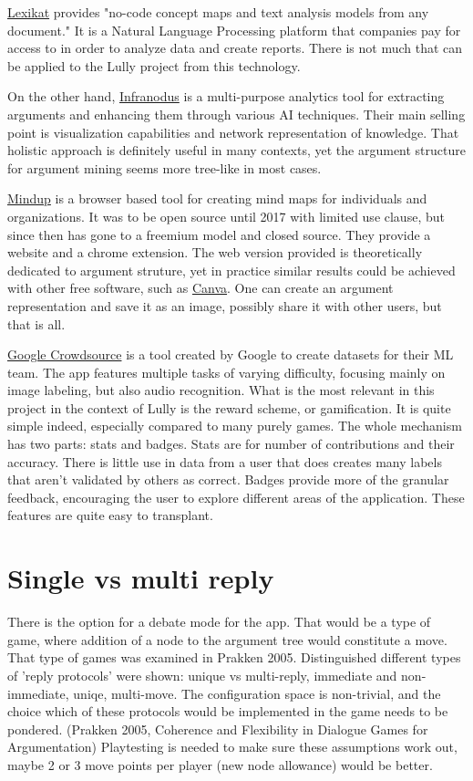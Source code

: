 \documentclass{article}
\begin{document}
\href{https://lexikat.com/#/}{Lexikat} provides "no-code concept maps and text analysis models from any document." It is a Natural Language Processing platform that companies pay for access to in order to analyze data and create reports. There is not much that can be applied to the Lully project from this technology.

On the other hand, \href{https://infranodus.com/}{Infranodus} is a multi-purpose analytics tool for extracting arguments and enhancing them through various AI techniques. Their main selling point is visualization capabilities and network representation of knowledge. That holistic approach is definitely useful in many contexts, yet the argument structure for argument mining seems more tree-like in most cases.

\href{https://www.mindmup.com/}{Mindup} is a browser based tool for creating mind maps for individuals and organizations. It was to be open source until 2017 with limited use clause, but since then has gone to a freemium model and closed source. They provide a website and a chrome extension. The web version provided is theoretically dedicated to argument struture, yet in practice similar results could be achieved with other free software, such as \href{https://www.canva.com/}{Canva}. One can create an argument representation and save it as an image, possibly share it with other users, but that is all.

\href{https://en.wikipedia.org/wiki/Crowdsource_(app)}{Google Crowdsource} is a tool created by Google to create datasets for their ML team. The app features multiple tasks of varying difficulty, focusing mainly on image labeling, but also audio recognition. What is the most relevant in this project in the context of Lully is the reward scheme, or gamification. It is quite simple indeed, especially compared to many purely games. The whole mechanism has two parts: stats and badges. Stats are for number of contributions and their accuracy. There is little use in data from a user that does creates many labels that aren't validated by others as correct. Badges provide more of the granular feedback, encouraging the user to explore different areas of the application. These features are quite easy to transplant.

\section{Single vs multi reply}
There is the option for a debate mode for the app.  That would be a type of game, where addition of a node to the argument tree would constitute a move.
That type of games was examined in Prakken 2005. Distinguished different types of 'reply protocols' were shown: unique vs multi-reply, immediate and non-immediate, uniqe, multi-move.
The configuration space is non-trivial, and the choice which of these protocols would be implemented in the game needs to be pondered.
(Prakken 2005, Coherence and Flexibility in Dialogue Games for Argumentation)
Playtesting is needed to make sure these assumptions work out, maybe 2 or 3 move points per player (new node allowance) would be better.
\end{document}
